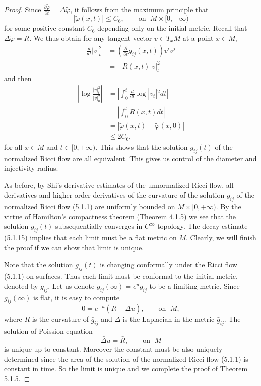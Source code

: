 \begin{proof}
Since $\frac{\partial \tilde{\varphi}}{\partial
t}=\Delta\tilde{\varphi}$, it follows from the maximum principle
that
$$
|\tilde\varphi(x,t)|\le C_6,\qquad \text{on }\; M\times
[0,+\infty)
$$
for some positive constant $C_6$ depending only on the initial
metric. Recall that $\Delta\tilde{\varphi}=R$. We thus obtain for
any tangent vector $v\in T_xM$ at a point $x\in M$,
\begin{align*}
\frac{d}{dt}|v|^2_t&
= \left(\frac{\partial }{\partial t}g_{ij}(x,t)\right)v^iv^j\\
&  = -R(x,t)|v|^2_t
\end{align*}
and then
\begin{align*}
\left|\log\frac{|v|^2_t}{|v|^2_0}\right|
&  = \left|\int_0^t\frac{d}{dt}\log\right|v_t|^2dt|\\
&  = \left|\int_0^tR(x,t)dt\right|\\
&  = \left|\tilde{\varphi}(x,t)-\tilde{\varphi}(x,0)\right|\\
&  \le 2C_6,
\end{align*}
for all $x\in M$ and $t\in[0,+\infty).$ This shows that the
solution $g_{ij}(t)$ of the normalized Ricci flow are all
equivalent. This gives us control of the diameter and injectivity
radius.

As before, by Shi's derivative estimates of the unnormalized Ricci
flow, all derivatives and higher order derivatives of the
curvature of the solution $g_{ij}$ of the normalized Ricci flow
(5.1.1) are uniformly bounded on $M\times[0,+\infty)$. By the
virtue of Hamilton's compactness theorem (Theorem 4.1.5) we see
that the solution $g_{ij}(t)$ subsequentially converges in
$C^\infty$ topology. The decay estimate (5.1.15) implies that each
limit must be a flat metric on $M$. Clearly, we will finish the
proof if we can show that limit is unique.

Note that the solution $g_{ij}(t)$ is changing conformally under
the Ricci flow (5.1.1) on surfaces. Thus each limit must be
conformal to the initial metric, denoted by $\bar{g}_{ij}$. Let us
denote $g_{ij}(\infty)=e^u\bar{g}_{ij}$ to be a limiting metric.
Since $g_{ij}(\infty)$ is flat, it is easy to compute
$$
0=e^{-u}(\bar{R}-\bar{\Delta}u),\qquad \mbox{on }\;M,
$$
where $\bar{R}$ is the curvature of $\bar{g}_{ij}$ and
$\bar{\Delta}$ is the Laplacian in the metric $\bar{g}_{ij}$. The
solution of Poission equation
$$\bar{\Delta}u=\bar{R},\qquad \mbox{on }\;M$$
is unique up to constant. Moreover the constant must be also
uniquely determined since the area of the solution of the
normalized Ricci flow (5.1.1) is constant in time. So the limit is
unique and we complete the proof of Theorem 5.1.5.
\end{proof}


